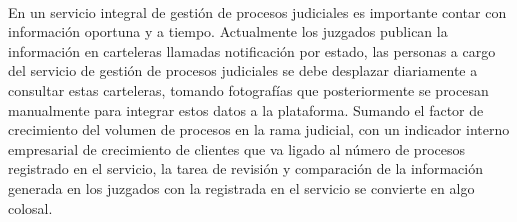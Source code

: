 \paragraph{}
En un servicio integral de gesti\'on de procesos judiciales es importante
contar con informaci\'on oportuna y a tiempo. Actualmente los juzgados 
publican la informaci\'on en carteleras llamadas notificaci\'on por estado,
las personas a cargo del servicio de gesti\'on de procesos judiciales se 
debe desplazar diariamente a consultar estas carteleras, tomando 
fotograf\'ias que posteriormente se procesan manualmente para integrar 
estos datos a la plataforma. Sumando el factor de crecimiento del 
volumen de procesos en la rama judicial, con un indicador interno 
empresarial de crecimiento de clientes que va ligado al n\'umero de 
procesos registrado en el servicio, la tarea de revisi\'on y comparaci\'on 
de la informaci\'on generada en los juzgados con la registrada en el 
servicio se convierte en algo colosal.
\pagebreak